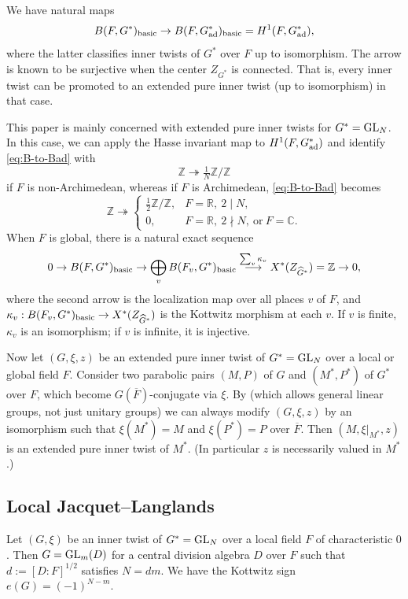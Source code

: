 \documentclass[11pt,reqno]{amsart}
\theoremstyle{plain}
\theoremstyle{definition}
\newcommand{\Z}{\mathbb{Z}}
\newcommand{\C}{\mathbb{C}}
\newcommand{\R}{\mathbb{R}}
\newcommand{\GL}{\tu{GL}}
\newcommand{\ad}{\tu{ad}}
\newcommand{\tu}{\textup}
\newcommand{\ol}{\overline}
\renewcommand{\hat}{\widehat}
\numberwithin{equation}{subsection}
\begin{document}
We have natural maps
\begin{equation}\label{eq:B-to-Bad}
 B(F,G^*)_{\tu{basic}}\to B(F,G^*_{\ad})_{\tu{basic}} = H^1(F,G^*_{\ad}),   
\end{equation}
where the latter classifies inner twists of $G^*$ over $F$ up to isomorphism. The arrow is known to be surjective when the center $Z_{G^*}$ is connected. That is, every inner twist can be promoted to an extended pure inner twist (up to isomorphism) in that case.

This paper is mainly concerned with extended pure inner twists for $G^*=\GL_N$. In this case, we can apply the Hasse invariant map to $H^1(F,G^*_{\ad})$ and identify \eqref{eq:B-to-Bad} with
\[
\Z\twoheadrightarrow \tfrac{1}{N}\Z/\Z
\]
if $F$ is non-Archimedean, whereas if $F$ is Archimedean, \eqref{eq:B-to-Bad} becomes
\[
\Z\twoheadrightarrow \begin{cases}
    \tfrac{1}{2}\Z/\Z, & F=\R,~2\mid N,\\
    0, & F=\R,~2\nmid N,~\mbox{or}~F=\C.
\end{cases}
\]
When $F$ is global, there is a natural exact sequence
\[
0 \to B(F,G^*)_{\tu{basic}}\to \bigoplus_{v} B(F_v,G^*)_{\tu{basic}}\stackrel{\sum_v \kappa_v}{\longrightarrow} X^*(Z_{\hat G^*})=\Z\to 0,
\]
where the second arrow is the localization map over all places $v$ of $F$, and $\kappa_v:B(F_v,G^*)_{\tu{basic}}\rightarrow X^*(Z_{\hat G^*})$ is the Kottwitz morphism at each $v$. If $v$ is finite, $\kappa_v$ is an isomorphism; if $v$ is infinite, it is injective.

Now let $(G,\xi,z)$ be an extended pure inner twist of $G^*=\GL_N$ over a local or global field $F$. Consider two parabolic pairs $(M,P)$ of $G$ and $(M^*,P^*)$ of $G^*$ over $F$, which become $G(\ol F)$-conjugate via $\xi$. By \cite[\S0.4.8]{KMSW} (which allows general linear groups, not just unitary groups) we can always modify $(G,\xi,z)$ by an isomorphism such that $\xi(M^*)=M$ and $\xi(P^*)=P$ over $\ol F$. Then $(M,\xi|_{M^*},z)$ is an extended pure inner twist of $M^*$. (In particular $z$ is necessarily valued in $M^*$.) 


\subsection{Local Jacquet--Langlands}\label{ss:localJL}

Let $(G,\xi)$ be an inner twist of $G^*=\GL_N$ over a local field $F$ of characteristic $0$. Then $G=\GL_m(D)$ for a central division algebra $D$ over $F$ such that $d:=[D:F]^{1/2}$ satisfies $N=dm$. We have the Kottwitz sign $e(G)=(-1)^{N-m}$.
\end{document}
